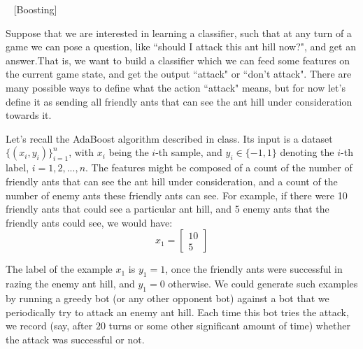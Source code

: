 \item ~ [Boosting]

Suppose that we are interested in learning a classifier, such that at any turn of a game we can pose a question, like ``should I attack this ant hill now?", and get an answer.That is, we want to build a classifier which we can feed some features on the current game state, and get the output ``attack" or ``don't attack". There are many possible ways to define what the action ``attack" means, but for now let's define it as sending all friendly ants that can see the ant hill under consideration towards it.

Let's recall the AdaBoost algorithm described in class. Its input is a dataset $\{(x_{i},y_{i})\}_{i=1}^{n}$, with $x_i$ being the $i$-th sample, and $y_{i}\in \{-1,1\}$ denoting the $i$-th label, $i=1,2,...,n$. The features might be composed of a count of the number of friendly ants that can see the ant hill under consideration, and a count of the number of enemy ants these friendly ants can see. For example, if there were 10 friendly ants that could see a particular ant hill, and 5 enemy ants that the friendly ants could see, we would have:
$$x_1 = \begin{bmatrix} 10 \\ 5 \end{bmatrix}$$

The label of the example $x_{1}$ is $y_{1} = 1$, once the friendly ants were successful in razing the enemy ant hill, and $y_{1} = 0$ otherwise. We could generate such examples by running a greedy bot (or any other opponent bot) against a bot that we periodically try to attack an enemy ant hill. Each time this bot tries the attack, we record (say, after $20$ turns or some other significant amount of time) whether the attack was successful or not.

